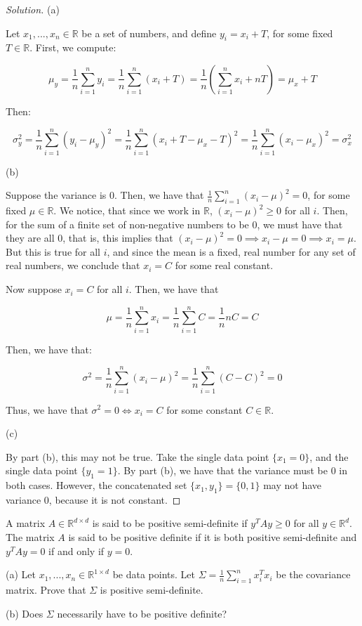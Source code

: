 \documentclass[10pt]{article}
\newenvironment{problem}[2][]{\begin{trivlist}
\item[\hskip \labelsep {\bfseries #1}\hskip \labelsep {\bfseries #2.}]}{\end{trivlist}}
\begin{document}
\begin{proof}[Solution]

(a)

Let $x_1,...,x_n \in \mathbb{R}$ be a set of numbers, and define $y_i = x_i + T$, for some fixed $T \in \mathbb{R}$. First, we compute:

$$\mu_y =\frac{1}{n} \sum_{i=1}^n y_i =\frac{1}{n} \sum_{i=1}^n (x_i + T)  = \frac{1}{n} \left( \sum_{i=1}^n x_i + nT \right)= \mu_x + T$$

Then:

$$ \sigma^2_y =  \frac{1}{n} \sum_{i=1}^n (y_i - \mu_y)^2 =\frac{1}{n} \sum_{i=1}^n (x_i + T - \mu_x - T)^2 = \frac{1}{n} \sum_{i=1}^n (x_i - \mu_x)^2 = \sigma^2_x$$

(b)

Suppose the variance is $0$. Then, we have that $\frac{1}{n} \sum_{i=1}^n (x_i - \mu)^2 = 0$, for some fixed $\mu \in \mathbb{R}$. We notice, that since we work in $\mathbb{R}$, $(x_i - \mu)^2 \geq 0$ for all $i$. Then, for the sum of a finite set of non-negative numbers to be 0, we must have that they are all 0, that is, this implies that $(x_i - \mu)^2 = 0 \implies x_i - \mu = 0 \implies x_i = \mu$. But this is true for all $i$, and since the mean is a fixed, real number for any set of real numbers, we conclude that $x_i = C$ for some real constant.

Now suppose $x_i = C$ for all $i$. Then, we have that

$$ \mu =\frac{1}{n} \sum_{i=1}^n x_i = \frac{1}{n}  \sum_{i=1}^n C =  \frac{1}{n} nC = C$$

Then, we have that:

$$ \sigma^2 = \frac{1}{n} \sum_{i=1}^n (x_i - \mu)^2 = \frac{1}{n} \sum_{i=1}^n (C - C)^2 = 0$$

Thus, we have that $\sigma^2 = 0 \iff x_i = C$ for some constant $C \in \mathbb{R}$.

(c)

By part (b), this may not be true. Take the single data point $\{ x_1 = 0 \}$, and the single data point $\{ y_1 = 1 \}$. By part (b), we have that the variance must be 0 in both cases. However, the concatenated set $\{ x_1, y_1 \} = \{ 0, 1 \}$ may not have variance 0, because it is not constant.

\end{proof}

\begin{problem}{Question 3}

A matrix $A \in \mathbb{R}^{d \times d}$ is said to be positive semi-definite if $y^T A y \geq 0$ for all $y \in \mathbb{R}^{d}$. The matrix $A$ is said to be positive definite if it is both positive semi-definite and $y^T A y = 0$ if and only if $y = 0$.

(a) Let $x_1,...,x_n \in \mathbb{R}^{1 \times d}$ be data points. Let $\Sigma = \frac{1}{n} \sum_{i=1}^n x_i^T x_i$ be the covariance matrix. Prove that $\Sigma$ is positive semi-definite.

(b) Does $\Sigma$ necessarily have to be positive definite?

\end{problem}
\end{document}
